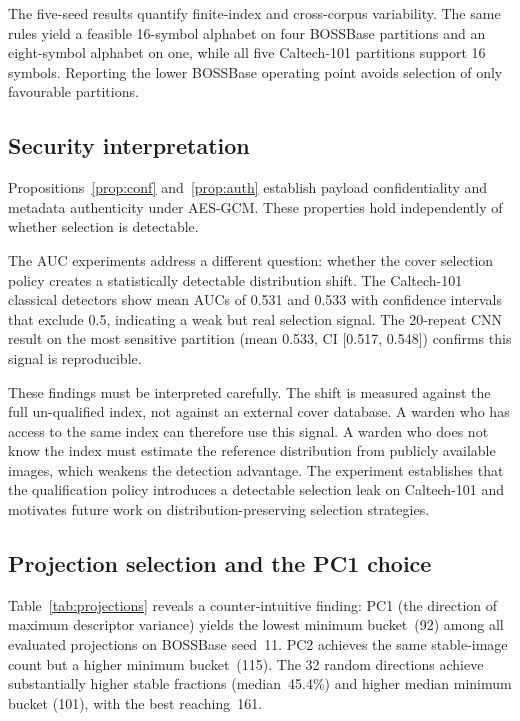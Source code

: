 ﻿\documentclass[10pt,journal]{IEEEtran}
\begin{document}
The five-seed results quantify finite-index and cross-corpus
variability. The same rules yield a feasible 16-symbol alphabet on
four BOSSBase partitions and an eight-symbol alphabet on one, while
all five Caltech-101 partitions support 16 symbols. Reporting the
lower BOSSBase operating point avoids selection of only favourable
partitions.

\subsection{Security interpretation}
\label{subsec:security}

Propositions~\ref{prop:conf} and~\ref{prop:auth} establish payload
confidentiality and metadata authenticity under AES-GCM. These
properties hold independently of whether selection is detectable.

The AUC experiments address a different question: whether the cover
selection policy creates a statistically detectable distribution
shift. The Caltech-101 classical detectors show mean AUCs of 0.531
and 0.533 with confidence intervals that exclude 0.5, indicating a
weak but real selection signal. The 20-repeat CNN result on the most
sensitive partition (mean 0.533, CI [0.517, 0.548]) confirms this
signal is reproducible.

These findings must be interpreted carefully. The shift is measured
against the full un-qualified index, not against an external cover
database. A warden who has access to the same index can therefore use
this signal. A warden who does not know the index must estimate the
reference distribution from publicly available images, which weakens
the detection advantage. The experiment establishes that the
qualification policy introduces a detectable selection leak on
Caltech-101 and motivates future work on distribution-preserving
selection strategies.

\subsection{Projection selection and the PC1 choice}
\label{subsec:projection}

Table~\ref{tab:projections} reveals a counter-intuitive finding:
PC1 (the direction of maximum descriptor variance) yields the lowest
minimum bucket~(92) among all evaluated projections on BOSSBase
seed~11. PC2 achieves the same stable-image count but a higher minimum
bucket~(115). The 32 random directions achieve substantially higher
stable fractions (median~45.4\%) and higher median minimum bucket
(101), with the best reaching~161.
\end{document}
